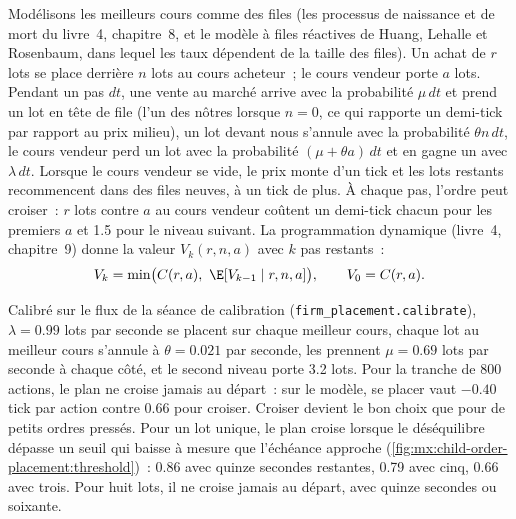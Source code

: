 Modélisons les meilleurs cours comme des files (les processus de naissance et de mort du livre~4, chapitre~8, et le modèle à files réactives de Huang, Lehalle et Rosenbaum,
dans lequel les taux dépendent de la taille des files). Un achat de $r$ lots se place derrière $n$ lots au cours acheteur~; le cours vendeur porte $a$ lots. Pendant un pas
$dt$, une vente au marché arrive avec la probabilité $\mu\,dt$ et prend un lot en tête de file (l'un des nôtres lorsque $n=0$, ce qui rapporte un demi-tick par rapport au prix milieu),
un lot devant nous s'annule avec la probabilité $\theta n\,dt$, le cours vendeur perd un lot avec la probabilité $(\mu+\theta a)\,dt$ et en gagne un avec $\lambda\,dt$.
Lorsque le cours vendeur se vide, le prix monte d'un tick et les lots restants recommencent dans des files neuves, à un tick de plus. À chaque pas, l'ordre peut
croiser~: $r$ lots contre $a$ au cours vendeur coûtent un demi-tick chacun pour les premiers $a$ et 1.5 pour le niveau suivant. La programmation dynamique (livre~4,
chapitre~9) donne la valeur $V_k(r,n,a)$ avec $k$ pas restants~:
\[
V_k=\min\bigl(C(r,a),\ \E[V_{k-1}\mid r,n,a]\bigr),\qquad V_0=C(r,a).
\]

\label{lst:mx:child-order-placement:dp}

Calibré sur le flux de la séance de calibration (\texttt{firm\_placement.calibrate}), $\lambda=0.99$ lots par seconde se placent sur chaque meilleur cours, chaque lot au
meilleur cours s'annule à $\theta=0.021$ par seconde, les  prennent $\mu=0.69$ lots par seconde à chaque côté, et le second niveau porte 3.2 lots. Pour la
tranche de 800 actions, le plan ne croise jamais au départ~: sur le modèle, se placer vaut $-0.40$ tick par action contre 0.66 pour croiser. Croiser devient
le bon choix que pour de petits ordres pressés. Pour un lot unique, le plan croise lorsque le déséquilibre dépasse un seuil qui baisse à mesure que l'échéance approche
(\cref{fig:mx:child-order-placement:threshold})~: 0.86 avec quinze secondes restantes, 0.79 avec cinq, 0.66 avec trois. Pour huit lots, il ne croise jamais
au départ, avec quinze secondes ou soixante.

